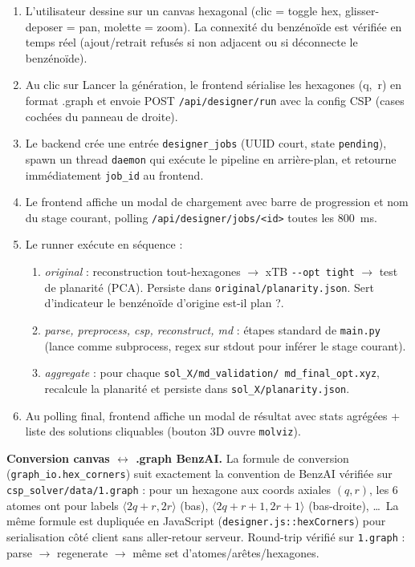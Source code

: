 \begin{enumerate}
  \item L'utilisateur dessine sur un canvas hexagonal (clic = toggle hex,
    glisser-deposer = pan, molette = zoom). La connexité du benzénoïde
    est vérifiée en temps réel (ajout/retrait refusés si non adjacent
    ou si déconnecte le benzénoïde).
  \item Au clic sur \og{}Lancer la génération\fg{}, le frontend
    sérialise les hexagones (q,~r) en format .graph et envoie POST
    \texttt{/api/designer/run} avec la config CSP (cases cochées du
    panneau de droite).
  \item Le backend crée une entrée \texttt{designer\_jobs} (UUID
    court, state \texttt{pending}), spawn un thread \texttt{daemon}
    qui exécute le pipeline en arrière-plan, et retourne immédiatement
    \texttt{job\_id} au frontend.
  \item Le frontend affiche un modal de chargement avec barre de
    progression et nom du stage courant, polling
    \texttt{/api/designer/jobs/<id>} toutes les 800~ms.
  \item Le runner exécute en séquence :
    \begin{enumerate}[label=\arabic*.]
      \item \emph{original} : reconstruction tout-hexagones $\to$ xTB
        \texttt{-{}-opt tight} $\to$ test de planarité (PCA). Persiste
        dans \texttt{original/planarity.json}. Sert d'indicateur
        \og{}le benzénoïde d'origine est-il plan ?\fg{}.
      \item \emph{parse, preprocess, csp, reconstruct, md} : étapes
        standard de \texttt{main.py} (lance comme subprocess, regex sur
        stdout pour inférer le stage courant).
      \item \emph{aggregate} : pour chaque \texttt{sol\_X/md\_validation/
        md\_final\_opt.xyz}, recalcule la planarité et persiste dans
        \texttt{sol\_X/planarity.json}.
    \end{enumerate}
  \item Au polling final, frontend affiche un modal de résultat avec
    stats agrégées + liste des solutions cliquables (bouton 3D ouvre
    \texttt{molviz}).
\end{enumerate}

\textbf{Conversion canvas $\leftrightarrow$ .graph BenzAI.} La formule
de conversion (\texttt{graph\_io.hex\_corners}) suit exactement la
convention de BenzAI vérifiée sur \texttt{csp\_solver/data/1.graph} :
pour un hexagone aux coords axiales $(q, r)$, les 6 atomes ont pour
labels $\langle 2q+r, 2r \rangle$ (bas), $\langle 2q+r+1, 2r+1 \rangle$
(bas-droite), \ldots~La même formule est dupliquée en JavaScript
(\texttt{designer.js::hexCorners}) pour serialisation côté client sans
aller-retour serveur. Round-trip vérifié sur \texttt{1.graph} :
parse $\to$ regenerate $\to$ même set d'atomes/arêtes/hexagones.

